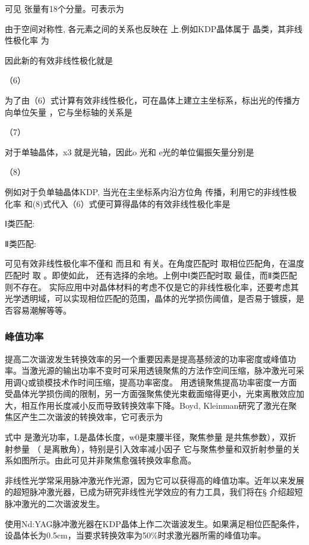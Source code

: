 可见 张量有18个分量。可表示为
        
由于空间对称性, 各元素之间的关系也反映在 上.例如KDP晶体属于 晶类，其非线性极化率 为
             
因此新的有效非线性极化就是

                           （6）                 

为了由（6）式计算有效非线性极化，可在晶体上建立主坐标系，标出光的传播方向单位矢量 ，它与坐标轴的关系是

                                      （7）
                            
对于单轴晶体，x3 就是光轴，因此o 光和 e光的单位偏振矢量分别是

                 （8）

例如对于负单轴晶体KDP, 当光在主坐标系内沿方位角 传播，利用它的非线性极化率 和(8)式代入（6）式便可算得晶体的有效非线性极化率是

Ⅰ类匹配:     

Ⅱ类匹配:     

可见有效非线性极化率不僅和 而且和 有关。在角度匹配时  取相位匹配角，在温度匹配时 取 。即使如此， 还有选择的余地。上例中Ⅰ类匹配时取 最佳，而Ⅱ类匹配则不存在。
   实际应用中对晶体材料的考虑不仅是它的非线性极化率，还要考虑其光学透明域，可以实现相位匹配的范围，晶体的光学损伤阈值，是否易于镀膜，是否容易潮解等等。

\subsubsection{峰值功率}

提高二次谐波发生转换效率的另一个重要因素是提高基频波的功率密度或峰值功率。当激光源的输出功率不变时可采用透镜聚焦的方法作空间压缩，脉冲激光可采用调Q或锁模技术作时间压缩，提高功率密度。
用透镜聚焦提高功率密度一方面受晶体光学损伤阈的限制，另一方面强聚焦使光束截面缩得更小，光束离散效应加大，相互作用长度减小反而导致转换效率下降。Boyd, Kleinman研究了激光在聚焦区产生二次谐波的转换效率，它可表示为
 
式中 是激光功率，L是晶体长度，w0是束腰半径，聚焦参量 是共焦参数），双折射参量 （ 是离散角），特别是引入效率减小因子 它与聚焦参量和双折射参量的关系如图所示。由此可见并非聚焦愈强转换效率愈高。

非线性光学常采用脉冲激光作光源，因为它可以获得高的峰值功率。近年以来发展的超短脉冲激光器，已成为研究非线性光学效应的有力工具，我们将在§ 介绍超短脉冲激光的二次谐波发生。

\begin{example}
    使用Nd:YAG脉冲激光器在KDP晶体上作二次谐波发生。如果满足相位匹配条件，设晶体长为0.5cm，当要求转换效率为50\%时求激光器所需的峰值功率。
\end{example}


